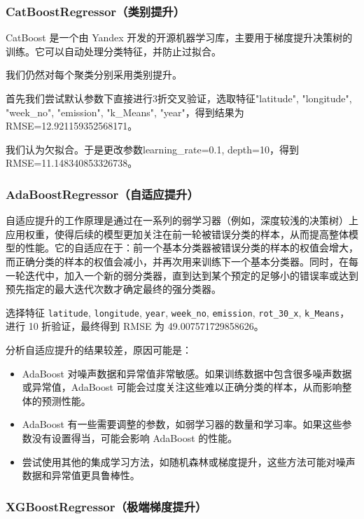 \documentclass{ctexart}
\begin{document}
\subsubsection{CatBoostRegressor（类别提升）}

CatBoost 是一个由 Yandex 开发的开源机器学习库，主要用于梯度提升决策树的训练。它可以自动处理分类特征，并防止过拟合。

我们仍然对每个聚类分别采用类别提升。

首先我们尝试默认参数下直接进行3折交叉验证，选取特征"latitude", "longitude", "week\_no", "emission", "k\_Means", "year"，得到结果为RMSE=12.921159352568171。

我们认为欠拟合。于是更改参数learning\_rate=0.1, depth=10，得到RMSE=11.148340853326738。

\subsubsection{AdaBoostRegressor（自适应提升）}

自适应提升的工作原理是通过在一系列的弱学习器（例如，深度较浅的决策树）上应用权重，使得后续的模型更加关注在前一轮被错误分类的样本，从而提高整体模型的性能。它的自适应在于：前一个基本分类器被错误分类的样本的权值会增大，而正确分类的样本的权值会减小，并再次用来训练下一个基本分类器。同时，在每一轮迭代中，加入一个新的弱分类器，直到达到某个预定的足够小的错误率或达到预先指定的最大迭代次数才确定最终的强分类器。

选择特征 \texttt{latitude}, \texttt{longitude}, \texttt{year}, \texttt{week\_no}, \texttt{emission}, \texttt{rot\_30\_x}, \texttt{k\_Means}，进行 10 折验证，最终得到 RMSE 为 49.007571729858626。

分析自适应提升的结果较差，原因可能是：

\begin{itemize}
      \item AdaBoost 对噪声数据和异常值非常敏感。如果训练数据中包含很多噪声数据或异常值，AdaBoost 可能会过度关注这些难以正确分类的样本，从而影响整体的预测性能。
      \item AdaBoost 有一些需要调整的参数，如弱学习器的数量和学习率。如果这些参数没有设置得当，可能会影响 AdaBoost 的性能。
      \item 尝试使用其他的集成学习方法，如随机森林或梯度提升，这些方法可能对噪声数据和异常值更具鲁棒性。
\end{itemize}

\subsubsection{XGBoostRegressor（极端梯度提升）}
\end{document}
